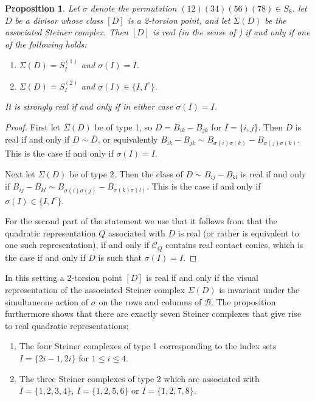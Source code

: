 \documentclass[a4paper,10pt]{amsart}
\theoremstyle{definition}
\theoremstyle{plain}
\newtheorem{prop}[Def]{Proposition}
\newcommand{\cB}{{\mathcal B}}
\newcommand{\cC}{{\mathcal C}}
\begin{document}
\begin{prop}
    Let $\sigma$ denote the permutation $(12)(34)(56)(78) \in S_8$, let $D$ be a divisor whose class $[D]$ is a 2-torsion point, and let $\Sigma(D)$ be the associated Steiner complex. Then $[D]$ is real (in the sense of ) if and only if one of the following holds:
    \begin{enumerate}
        \item $\Sigma(D) = S^{(1)}_I$ and $\sigma(I) = I$.
        \item $\Sigma(D) = S^{(2)}_I$ and $\sigma(I) \in \{I, I^c\}$.
    \end{enumerate}
    It is strongly real if and only if in either case $\sigma(I) = I$.
\end{prop}

\begin{proof}
    First let $\Sigma(D)$ be of type 1, so $D = B_{ik} - B_{jk}$ for $I = \{i, j\}$. Then $D$ is real if and only if $D \sim \overline{D}$, or equivalently $B_{ik} - B_{jk} \sim B_{\sigma(i)\sigma(k)} - B_{\sigma(j)\sigma(k)}$. This is the case if and only if $\sigma(I) = I$.
    
    Next let $\Sigma(D)$ be of type 2. Then the class of $D \sim B_{ij} - B_{kl}$ is real if and only if $B_{ij} - B_{kl} \sim B_{\sigma(i)\sigma(j)} - B_{\sigma(k)\sigma(l)}$. This is the case if and only if $\sigma(I) \in \{I, I^c \}$.

    For the second part of the statement we use that it follows from \cite[p.~727--728]{plaumann} that the quadratic representation $Q$ associated with $D$ is real (or rather is equivalent to one such representation), if and only if $\cC_Q$ contains real contact conics, which is the case if and only if $D$ is such that $\sigma(I) = I$.
\end{proof}

In this setting a 2-torsion point $[D]$ is real if and only if the visual representation of the associated Steiner complex $\Sigma(D)$ is invariant under the simultaneous action of $\sigma$ on the rows and columns of $\cB$.
The proposition furthermore shows that there are exactly seven Steiner complexes that give rise to real quadratic representations:
\begin{enumerate}
    \item The four Steiner complexes of type 1 corresponding to the index sets $I =\{2i-1, 2i\}$ for $1 \leq i \leq 4$.
    \item The three Steiner complexes of type 2 which are associated with $I = \{1,2,3,4\}$, $I = \{1,2,5,6\}$ or $I = \{1,2,7,8\}$.
\end{enumerate}
\end{document}
